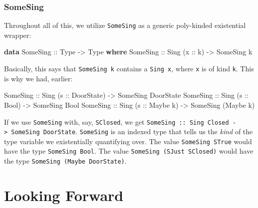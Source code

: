 \documentclass[]{article}
\newenvironment{Shaded}{}{}
\newcommand{\KeywordTok}[1]{\textcolor[rgb]{0.00,0.44,0.13}{\textbf{#1}}}
\newcommand{\DataTypeTok}[1]{\textcolor[rgb]{0.56,0.13,0.00}{#1}}
\newcommand{\OtherTok}[1]{\textcolor[rgb]{0.00,0.44,0.13}{#1}}
\newcommand{\NormalTok}[1]{#1}
\begin{document}
\subsubsection{SomeSing}\label{somesing}

Throughout all of this, we utilize \texttt{SomeSing} as a generic poly-kinded
existential wrapper:

\begin{Shaded}
\begin{Highlighting}[]
\KeywordTok{data} \DataTypeTok{SomeSing}\OtherTok{ ::} \DataTypeTok{Type} \OtherTok{->} \DataTypeTok{Type} \KeywordTok{where}
    \DataTypeTok{SomeSing}\OtherTok{ ::} \DataTypeTok{Sing}\NormalTok{ (}\OtherTok{x ::}\NormalTok{ k) }\OtherTok{->} \DataTypeTok{SomeSing}\NormalTok{ k}
\end{Highlighting}
\end{Shaded}

Basically, this says that \texttt{SomeSing\ k} contains a \texttt{Sing\ x},
where \texttt{x} is of kind \texttt{k}. This is why we had, earlier:

\begin{Shaded}
\begin{Highlighting}[]
\DataTypeTok{SomeSing}\OtherTok{ ::} \DataTypeTok{Sing}\NormalTok{ (}\OtherTok{s ::} \DataTypeTok{DoorState}\NormalTok{) }\OtherTok{->} \DataTypeTok{SomeSing} \DataTypeTok{DoorState}
\DataTypeTok{SomeSing}\OtherTok{ ::} \DataTypeTok{Sing}\NormalTok{ (}\OtherTok{s ::} \DataTypeTok{Bool}\NormalTok{)      }\OtherTok{->} \DataTypeTok{SomeSing} \DataTypeTok{Bool}
\DataTypeTok{SomeSing}\OtherTok{ ::} \DataTypeTok{Sing}\NormalTok{ (}\OtherTok{s ::} \DataTypeTok{Maybe}\NormalTok{ k)   }\OtherTok{->} \DataTypeTok{SomeSing}\NormalTok{ (}\DataTypeTok{Maybe}\NormalTok{ k)}
\end{Highlighting}
\end{Shaded}

If we use \texttt{SomeSing} with, say, \texttt{SClosed}, we get
\texttt{SomeSing\ ::\ Sing\ \textquotesingle{}Closed\ -\textgreater{}\ SomeSing\ DoorState}.
\texttt{SomeSing} is an indexed type that tells us the \emph{kind} of the type
variable we existentially quantifying over. The value \texttt{SomeSing\ STrue}
would have the type \texttt{SomeSing\ Bool}. The value
\texttt{SomeSing\ (SJust\ SClosed)} would have the type
\texttt{SomeSing\ (Maybe\ DoorState)}.

\section{Looking Forward}\label{looking-forward}
\end{document}
